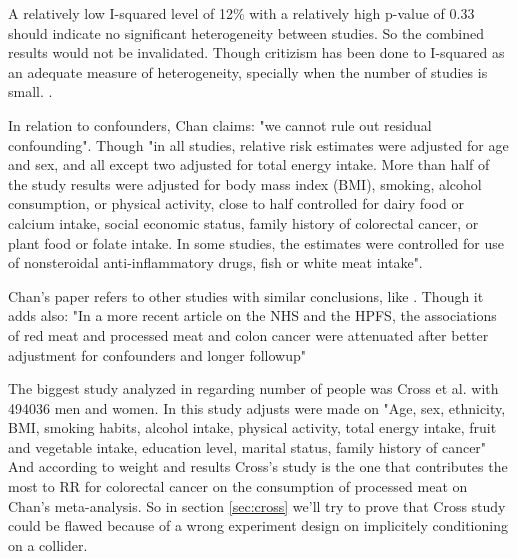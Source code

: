 \documentclass{article}
\begin{document}
A relatively low I-squared level of 12\% with a relatively high p-value of 0.33 should indicate no significant heterogeneity between studies. So the combined results would not be invalidated. Though critizism has been done to I-squared as an adequate measure of heterogeneity, specially when the number of studies is small. \cite{hippel}.

In relation to confounders, Chan claims: "we cannot rule out residual confounding". Though "in all studies, relative risk estimates were adjusted for age and sex, and all except two adjusted for total energy intake. More than
half of the study results were adjusted for body mass index (BMI), smoking, alcohol consumption, or physical activity, close to half controlled for dairy food or calcium intake, social economic status,
family history of colorectal cancer, or plant food or folate intake.
In some studies, the estimates were controlled for use of nonsteroidal
anti-inflammatory drugs, fish or white meat intake". %

Chan's paper refers to other studies with similar conclusions, like \cite{aicr,wei2009}.
Though it adds also: "In a more recent article on the NHS and the HPFS, the
associations of red meat and processed meat and colon cancer were
attenuated after better adjustment for confounders and longer followup" \cite{wei}

The biggest study analyzed in \cite{chan} regarding number of people was Cross et al. \cite{cross} with 494036 men and women. In this study adjusts were made on "Age, sex, ethnicity, BMI, smoking habits, alcohol intake, physical activity, total energy intake, fruit and vegetable intake, education level, marital status, family history of cancer"
And according to weight and results Cross's study is the one that contributes the most to RR for colorectal cancer on the consumption of processed meat on Chan's meta-analysis. So in section \ref{sec:cross} we'll try to prove that Cross study could be flawed because of a wrong experiment design on implicitely conditioning on a collider.
\end{document}

